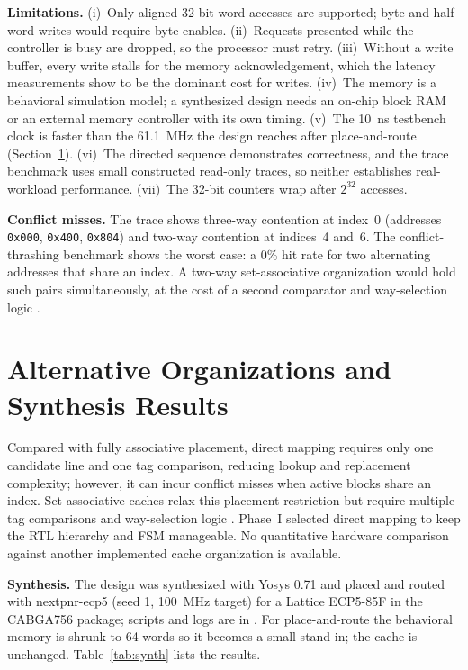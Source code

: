 \documentclass[conference,a4paper]{IEEEtran}
\begin{document}
\textbf{Limitations.} (i)~Only aligned 32-bit word accesses are supported; byte and half-word writes would require byte enables. (ii)~Requests presented while the controller is busy are dropped, so the processor must retry. (iii)~Without a write buffer, every write stalls for the memory acknowledgement, which the latency measurements show to be the dominant cost for writes. (iv)~The memory is a behavioral simulation model; a synthesized design needs an on-chip block RAM or an external memory controller with its own timing. (v)~The 10~ns testbench clock is faster than the 61.1~MHz the design reaches after place-and-route (Section~\ref{sec:alt}). (vi)~The directed sequence demonstrates correctness, and the trace benchmark uses small constructed read-only traces, so neither establishes real-workload performance. (vii)~The 32-bit counters wrap after $2^{32}$ accesses.

\textbf{Conflict misses.} The trace shows three-way contention at index~0 (addresses \texttt{0x000}, \texttt{0x400}, \texttt{0x804}) and two-way contention at indices~4 and~6. The conflict-thrashing benchmark shows the worst case: a 0\% hit rate for two alternating addresses that share an index. A two-way set-associative organization would hold such pairs simultaneously, at the cost of a second comparator and way-selection logic \cite{patterson,iitkgp}.

\section{Alternative Organizations and Synthesis Results}\label{sec:alt}
Compared with fully associative placement, direct mapping requires only one candidate line and one tag comparison, reducing lookup and replacement complexity; however, it can incur conflict misses when active blocks share an index. Set-associative caches relax this placement restriction but require multiple tag comparisons and way-selection logic \cite{patterson,iitkgp}. Phase~I selected direct mapping to keep the RTL hierarchy and FSM manageable. No quantitative hardware comparison against another implemented cache organization is available.

\textbf{Synthesis.} The design was synthesized with Yosys 0.71 and placed and routed with nextpnr-ecp5 (seed 1, 100~MHz target) for a Lattice ECP5-85F in the CABGA756 package; scripts and logs are in . For place-and-route the behavioral memory is shrunk to 64 words so it becomes a small stand-in; the cache is unchanged. Table~\ref{tab:synth} lists the results.
\end{document}
